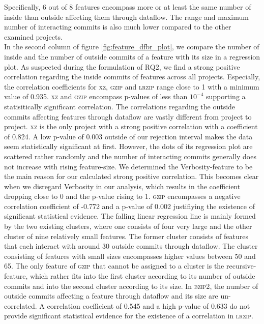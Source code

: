 Specifically, 6 out of 8 features encompass more or at least the same number of inside than outside affecting them through dataflow.
The range and maximum number of interacting commits is also much lower compared to the other examined projects. \\
In the second column of figure \ref{fig:feature_dfbr_plot}, we compare the number of inside and the number of outside commits of a feature with its size in a regression plot.
As suspected during the formulation of RQ2, we find a strong positive correlation regarding the inside commits of features across all projects.
Especially, the correlation coefficients for \textsc{xz}, \textsc{gzip} and \textsc{lrzip} range close to 1 with a minimum value of 0.935.
\textsc{xz} and \textsc{gzip} encompass p-values of less than $10^{-4}$ supporting a statisitically significant correlation.
The correlations regarding the outside commits affecting features through dataflow are vastly different from project to project.
\textsc{xz} is the only project with a strong positive correlation with a coefficient of 0.824.
A low p-value of 0.003 outside of our rejection interval makes the data seem statistically significant at first.
However, the dots of its regression plot are scattered rather randomly and the number of interacting commits generally does not increase with rising feature-size.
We determined the \textsf{Verbosity}-feature to be the main reason for our calculated strong positive correlation.
This becomes clear when we disregard \textsf{Verbosity} in our analysis, which results in the coefficient dropping close to 0 and the p-value rising to 1.
\textsc{gzip} encompasses a negative correlation coefficient of -0.772 and a p-value of 0.002 justifiying the existence of significant statistical evidence.
The falling linear regression line is mainly formed by the two existing clusters, where one consists of four very large and the other cluster of nine relatively small features.
The former cluster consists of features that each interact with around 30 outside commits through dataflow.
The cluster consisting of features with small sizes encompasses higher values between 50 and 65.
The only feature of \textsc{gzip} that cannot be assigned to a cluster is the \textsf{recursive}-feature, which rather fits into the first cluster according to its number of outside commits and into the second cluster according to its size.
In \textsc{bzip2}, the number of outside commits affecting a feature through dataflow and its size are un-correlated.
A correlation coefficient of 0.545 and a high p-value of 0.633 do not provide significant statistical evidence for the existence of a correlation in \textsc{lrzip}. \\
